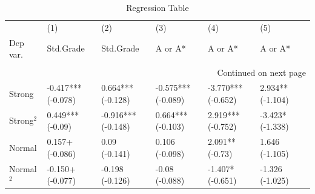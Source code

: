 
\small
\begin{longtable}{lllllll}
\caption{Regression Table} \label{tab:regression} \\
\toprule
 & (1) & (2) & (3) & (4) & (5) \\
Dep var. & Std.Grade & Std.Grade & A or A* & A or A* & A or A*\\
\midrule
\endfirsthead
\caption[]{Regression Table} \\
\toprule
\midrule
\endhead
\midrule
\multicolumn{7}{r}{Continued on next page} \\
\midrule
\endfoot
\bottomrule
\endlastfoot
 Strong & -0.417*** 
 (-0.078) & 0.664*** 
 (-0.128) & -0.575*** 
 (-0.089) & -3.770*** 
 (-0.652) & 2.934** 
 (-1.104) \\
Strong$^2$ & 0.449*** 
 (-0.09) & -0.916*** 
 (-0.148) & 0.664*** 
 (-0.103) & 2.919*** 
 (-0.752) & -3.423* 
 (-1.338) \\
Normal & 0.157+ 
 (-0.086) & 0.09 
 (-0.141) & 0.106 
 (-0.098) & 2.091** 
 (-0.73) & 1.646 
 (-1.105) \\
Normal $^2$ & -0.150+ 
 (-0.077) & -0.198 
 (-0.126) & -0.08 
 (-0.088) & -1.407* 
 (-0.651) & -1.326 
 (-1.025) \\


\end{longtable}
